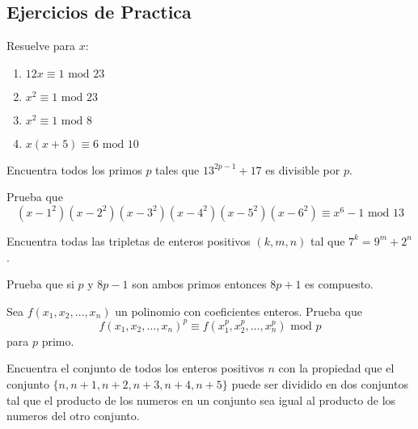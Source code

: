 \documentclass[11pt]{scrartcl}
\begin{document}
\subsection{Ejercicios de Practica}
\begin{exercise}
Resuelve para $x$:
\begin{enumerate}
    \item $12x\equiv 1 \text{ mod } 23$
    \item $x^2\equiv 1 \text{ mod } 23$
    \item $x^2 \equiv 1 \text{ mod } 8$
    \item $x(x+5) \equiv 6 \text{ mod } 10$
\end{enumerate}
\end{exercise}
\begin{exercise}
Encuentra todos los primos $p$ tales que $13^{2p-1}+17$ es divisible por $p$.
\end{exercise}

\begin{problem}
    Prueba que  
    $$(x-1^2)(x-2^2)(x-3^2)(x-4^2)(x-5^2)(x-6^2) \equiv x^6-1 \text{ mod } 13$$
\end{problem}
\begin{problem}
Encuentra todas las tripletas de enteros positivos $(k,m,n)$ tal que $7^k=9^m+2^n$.
\end{problem}

\begin{problem} 
Prueba que si $p$ y $8p-1$ son ambos primos entonces $8p+1$ es compuesto.
\end{problem}

\begin{problem}
Sea $f(x_1,x_2,\ldots,x_n)$ un polinomio con coeficientes enteros. Prueba que 
$$f(x_1,x_2, \ldots ,x_n)^p \equiv f(x_1^p,x_2^p, \ldots, x_n^p) \text{ mod } p$$
para $p$ primo.
\end{problem}

\begin{problem} [IMO 1970/4]
Encuentra el conjunto de todos los enteros positivos $n$ con la propiedad que el conjunto $\{n,n+1,n+2,n+3,n+4,n+5\}$ puede ser dividido en dos conjuntos tal que el producto de los numeros en un conjunto sea igual al producto de los numeros del otro conjunto.
\end{problem}
\end{document}
